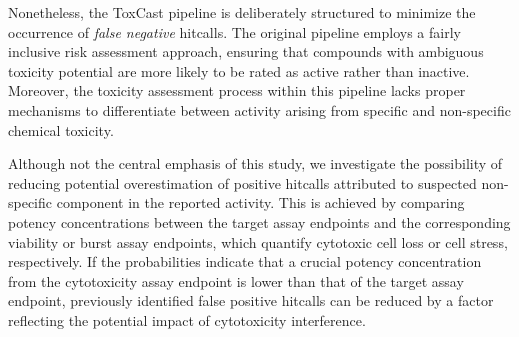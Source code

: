 Nonetheless, the ToxCast pipeline is deliberately structured to minimize the occurrence of \emph{false negative} hitcalls. The original pipeline employs a fairly inclusive risk assessment approach, ensuring that compounds with ambiguous toxicity potential are more likely to be rated as active rather than inactive. Moreover, the toxicity assessment process within this pipeline lacks proper mechanisms to differentiate between activity arising from specific and non-specific chemical toxicity.

Although not the central emphasis of this study, we investigate the possibility of reducing potential overestimation of positive hitcalls attributed to suspected non-specific component in the reported activity. This is achieved by comparing potency concentrations between the target assay endpoints and the corresponding viability or burst assay endpoints, which quantify cytotoxic cell loss or cell stress, respectively. If the probabilities indicate that a crucial potency concentration from the cytotoxicity assay endpoint is lower than that of the target assay endpoint, previously identified false positive hitcalls can be reduced by a factor reflecting the potential impact of cytotoxicity interference.






